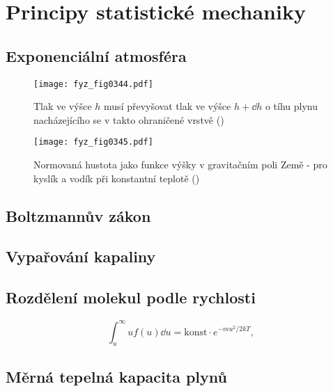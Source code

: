 \setchaptertoc
\chapter{Principy statistické mechaniky}\label{fyz:IchapXL}

  \section{Exponenciální atmosféra}\label{fyz:IchapXLsecI}

    \begin{figure}[ht!] %
      \centering
      \texttt{[image: fyz\_fig0344.pdf]}
      \caption{Tlak ve výšce \(h\) musí převyšovat tlak ve výšce \(h+\dd{h}\) o tíhu plynu 
               nacházejícího se v takto ohraničené vrstvě
               (\cite[s.~540]{Feynman01})}
      \label{fyz:fig0344}
    \end{figure}

    \begin{figure}[ht!] %
      \centering
      \texttt{[image: fyz\_fig0345.pdf]}
      \caption{Normovaná hustota jako funkce výšky v gravitačním poli Země - pro kyslík a vodík při 
               konstantní teplotě
               (\cite[s.~541]{Feynman01})}
      \label{fyz:fig0345}
    \end{figure}
    
  \section{Boltzmannův zákon}\label{fyz:IchapXLsecII}
  \section{Vypařování kapaliny}\label{fyz:IchapXLsecIII}
  \section{Rozdělení molekul podle rychlosti}\label{fyz:IchapXLsecIV}
    \begin{equation}\label{fyz:eq572}
      \int_u^\infty uf(u)\dd{u} = \text{konst}\cdot e^{-mu^2/2kT},
    \end{equation}
  \section{Měrná tepelná kapacita plynů}\label{fyz:IchapXLsecV}
